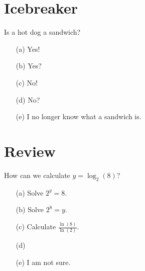\documentclass[14pt]{beamer}
\begin{document}
 

%

\section{Icebreaker}

\begin{frame}
  Is a hot dog a sandwich?
  
  \medskip
  \begin{itemize} \setlength\itemsep{2ex}
    \item[(a)] Yes!
    \item[(b)] Yes?
    \item[(c)] No!
    \item[(d)] No?
    \item[(e)] I no longer know what a sandwich is.
  \end{itemize} 
\end{frame}


\section{Review}
\begin{frame}
  How can we calculate \(y = \log_{2}(8)\)?
  \medskip
  \begin{itemize} \setlength\itemsep{2ex}
    \item[(a)] Solve \(2^{y} = 8\).
    \item[(b)] Solve \(2^{8} = y\).
    \item[(c)] Calculate \(\frac{\ln(8)}{\ln(2)}\). 
    \item[(d)] 
    \item[(e)] I am not sure.
  \end{itemize} 
\end{frame} 
\end{document}

